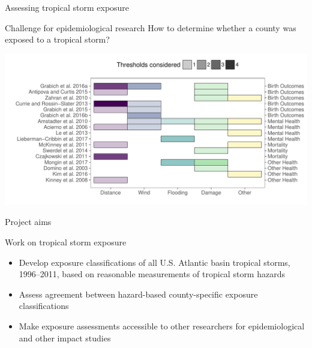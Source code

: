 \documentclass[ignorenonframetext,]{beamer}
\begin{document}
\begin{frame}{Assessing tropical storm exposure}

\begin{block}{Challenge for epidemiological research}
How to determine whether a county was exposed to a tropical storm?
\end{block}

\vspace{-0.3cm}

\begin{center}\includegraphics[height=0.77\textheight]{previous_exposure_metrics} \end{center}

\end{frame}

\begin{frame}{Project aims}

\begin{block}{Work on tropical storm exposure}
\begin{itemize}
  \item Develop exposure classifications of all U.S. Atlantic basin tropical storms, 1996--2011, based on reasonable measurements of tropical storm hazards
  \item Assess agreement between hazard-based county-specific exposure classifications
  \item Make exposure assessments accessible to other researchers for epidemiological and other impact studies 
\end{itemize}
\end{block}

\end{frame}
\end{document}
